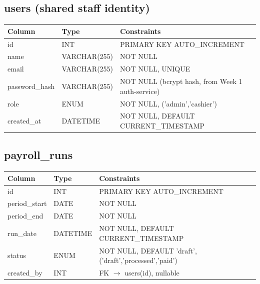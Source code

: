 \documentclass[11pt,a4paper]{report}
\newcommand{\schemahead}{%
  \toprule
  \textbf{Column} & \textbf{Type} & \textbf{Constraints} \\
  \midrule
}
\begin{document}
\subsection*{users (shared staff identity)}
\begin{center}
\begin{tabular}{@{}p{3.6cm}p{2.6cm}p{7.3cm}@{}}
\schemahead
id & INT & PRIMARY KEY AUTO\_INCREMENT \\
name & VARCHAR(255) & NOT NULL \\
email & VARCHAR(255) & NOT NULL, UNIQUE \\
password\_hash & VARCHAR(255) & NOT NULL (bcrypt hash, from Week 1 auth-service) \\
role & ENUM & NOT NULL, ('admin','cashier') \\
created\_at & DATETIME & NOT NULL, DEFAULT CURRENT\_TIMESTAMP \\
\bottomrule
\end{tabular}
\end{center}

\subsection*{payroll\_runs}
\begin{center}
\begin{tabular}{@{}p{3.6cm}p{2.6cm}p{7.3cm}@{}}
\schemahead
id & INT & PRIMARY KEY AUTO\_INCREMENT \\
period\_start & DATE & NOT NULL \\
period\_end & DATE & NOT NULL \\
run\_date & DATETIME & NOT NULL, DEFAULT CURRENT\_TIMESTAMP \\
status & ENUM & NOT NULL, DEFAULT 'draft', ('draft','processed','paid') \\
created\_by & INT & FK $\rightarrow$ users(id), nullable \\
\bottomrule
\end{tabular}
\end{center}
\end{document}

